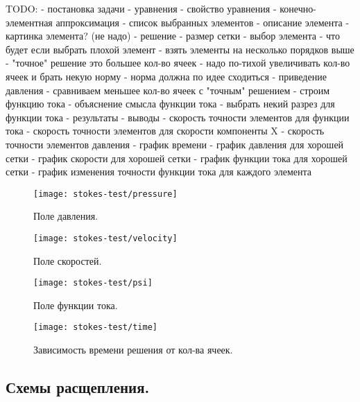 \documentclass[12pt]{article}
\begin{document}
TODO:
- постановка задачи
    - уравнения
    - свойство уравнения
    - конечно-элементная аппроксимация
    - список выбранных элементов
        - описание элемента
        - картинка элемента? (не надо)
- решение
    - размер сетки
    - выбор элемента
        - что будет если выбрать плохой элемент
        - взять элементы на несколько порядков выше
    - "точное" решение это большее кол-во ячеек
        - надо по-тихой увеличивать кол-во ячеек и брать некую норму
        - норма должна по идее сходиться
    - приведение давления
    - сравниваем меньшее кол-во ячеек с "точным" решением
    - строим функцию тока
        - объяснение смысла функции тока
        - выбрать некий разрез для функции тока
- результаты
    - выводы
        - скорость точности элементов для функции тока
        - скорость точности элементов для скорости компоненты X
        - скорость точности элементов давления
	- график времени
	- график давления для хорошей сетки
	- график скорости для хорошей сетки
	- график функции тока для хорошей сетки
	- график изменения точности функции тока для каждого элемента
	
	


\begin{figure}
\begin{center}
\texttt{[image: stokes-test/pressure]}
\caption{Поле давления.}
\label{fg:pressure}
\end{center}
\end{figure}

\begin{figure}
\texttt{[image: stokes-test/velocity]}
\caption{Поле скоростей.}
\label{fg:velocity}
\end{figure}

\begin{center}
  \begin{figure}
    \texttt{[image: stokes-test/psi]}
    \caption{Поле функции тока.}
    \label{fg:psi}
  \end{figure}
\end{center}

\begin{figure}
\texttt{[image: stokes-test/time]}
\caption{Зависимость времени решения от кол-ва ячеек.}
\label{fg:time}
\end{figure}

\subsection{Схемы расщепления.}
\end{document}
